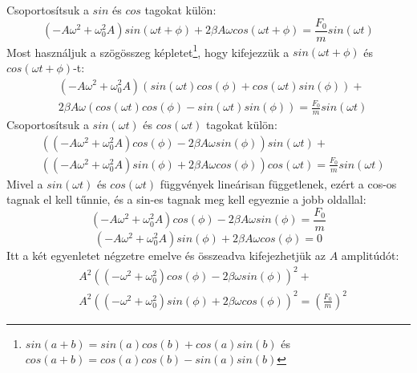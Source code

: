 \documentclass[../main.tex]{subfiles}
\begin{document}
Csoportosítsuk a $sin$ és $cos$ tagokat külön:
\begin{equation}
    \left( -A \omega^2 + \omega_0^2 A \right) sin(\omega t + \phi) + 2\beta A \omega cos(\omega t + \phi) = \frac{F_0}{m} sin(\omega t)
\end{equation}
Most használjuk a szögösszeg képletet\footnote{
$sin(a + b) = sin(a) cos(b) + cos(a) sin(b)$ és $cos(a + b) = cos(a) cos(b) - sin(a) sin(b)$
}, hogy kifejezzük a $sin(\omega t + \phi)$ és $cos(\omega t + \phi)$-t:
\begin{equation}
    \begin{aligned}
        & \left( -A \omega^2 + \omega_0^2 A \right) \left( sin(\omega t) cos(\phi) + cos(\omega t) sin(\phi) \right) + \\
        & 2\beta A \omega \left( cos(\omega t) cos(\phi) - sin(\omega t) sin(\phi) \right) = \frac{F_0}{m} sin(\omega t)
    \end{aligned}
\end{equation}
Csoportosítsuk a $sin(\omega t)$ és $cos(\omega t)$ tagokat külön:
\begin{equation}
    \begin{aligned}
        & \left( \left( -A \omega^2 + \omega_0^2 A \right) cos(\phi) - 2\beta A \omega sin(\phi) \right) sin(\omega t) + \\
        & \left( \left( -A \omega^2 + \omega_0^2 A \right) sin(\phi) + 2\beta A \omega cos(\phi) \right) cos(\omega t) = \frac{F_0}{m} sin(\omega t)
    \end{aligned}
\end{equation}
Mivel a $sin(\omega t)$ és $cos(\omega t)$ függvények lineárisan függetlenek, ezért a cos-os tagnak el kell tűnnie, és a sin-es tagnak meg kell egyeznie a jobb oldallal:
\begin{equation}
    \left( -A \omega^2 + \omega_0^2 A \right) cos(\phi) - 2\beta A \omega sin(\phi) = \frac{F_0}{m}
\end{equation}
\begin{equation}
    \left( -A \omega^2 + \omega_0^2 A \right) sin(\phi) + 2\beta A \omega cos(\phi) = 0
\end{equation}
Itt a két egyenletet négzetre emelve és összeadva kifejezhetjük az $A$ amplitúdót:
\begin{equation}
    \begin{aligned}
        & A^2 \left( \left( -\omega^2 + \omega_0^2 \right) cos(\phi) - 2\beta  \omega sin(\phi) \right)^2 + \\
        & A^2 \left( \left( - \omega^2 + \omega_0^2 \right) sin(\phi) + 2\beta  \omega cos(\phi) \right)^2 = \left(\frac{F_0}{m}\right)^2
    \end{aligned}
\end{equation}
\end{document}
